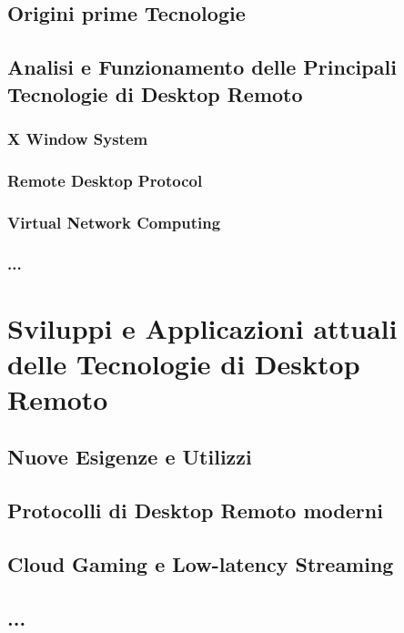 \documentclass[12pt,a4paper,openright,twoside]{book}
\begin{document}
\section{Origini prime Tecnologie}



\section{Analisi e Funzionamento delle Principali Tecnologie di Desktop Remoto}

\subsection{X Window System}

\subsection{Remote Desktop Protocol}

\subsection{Virtual Network Computing}

\subsection{...}

\chapter{Sviluppi e Applicazioni attuali delle Tecnologie di Desktop Remoto}

\section{Nuove Esigenze e Utilizzi}

\section{Protocolli di Desktop Remoto moderni}

\section{Cloud Gaming e Low-latency Streaming}

\section{...}
\end{document}
